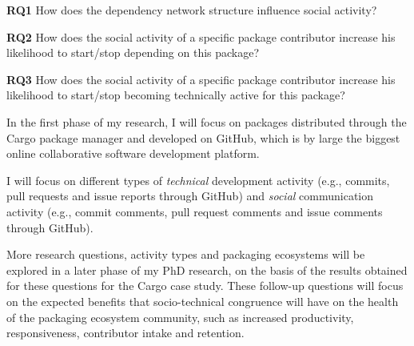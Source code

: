 \noindent \textbf{RQ1} How does the dependency network structure influence social activity? %

\noindent \textbf{RQ2} How does the social activity of a specific package contributor increase his likelihood to start/stop depending on this package?

\noindent \textbf{RQ3} How does the social activity of a specific package contributor increase his likelihood to start/stop becoming technically active for this package?


In the first phase of my research, I will focus on packages distributed through the Cargo package manager and developed on GitHub, which is by large the biggest online collaborative software development platform.

I will focus on different types of \emph{technical} development activity (e.g., commits, pull requests and issue reports through GitHub) and \emph{social} communication activity (e.g., commit comments, pull request comments and issue comments through GitHub). 

More research questions, activity types and packaging ecosystems will be explored in a later phase of my PhD research, on the basis of the results obtained for these questions for the Cargo case study. These follow-up questions will focus on the expected benefits that socio-technical congruence will have on the health of the packaging ecosystem community, such as increased productivity, responsiveness, contributor intake and retention.